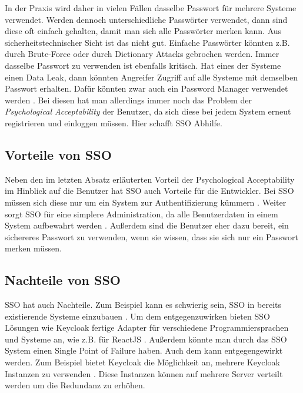 In der Praxis wird daher in vielen Fällen dasselbe Passwort für mehrere Systeme verwendet. Werden dennoch unterschiedliche Passwörter verwendet, dann sind diese oft einfach gehalten, damit man sich alle Passwörter merken kann. Aus sicherheitstechnischer Sicht ist das nicht gut. Einfache Passwörter könnten z.B. durch Brute-Force oder durch Dictionary Attacks gebrochen werden. Immer dasselbe Passwort zu verwenden ist ebenfalls kritisch. Hat eines der Systeme einen Data Leak, dann könnten Angreifer Zugriff auf alle Systeme mit demselben Passwort erhalten. Dafür könnten zwar auch ein Password Manager verwendet werden \cite{EB34}. Bei diesen hat man allerdings immer noch das Problem der \textit{Psychological Acceptability} der Benutzer, da sich diese bei jedem System erneut registrieren und einloggen müssen. Hier schafft SSO Abhilfe.

\subsection{Vorteile von SSO}


Neben den im letzten Absatz erläuterten Vorteil der Psychological Acceptability im Hinblick auf die Benutzer hat SSO auch Vorteile für die Entwickler. Bei SSO müssen sich diese nur um ein System zur Authentifizierung kümmern \cite{EB34}. Weiter sorgt SSO für eine simplere Administration, da alle Benutzerdaten in einem System aufbewahrt werden \cite{EB34}. Außerdem sind die Benutzer eher dazu bereit, ein sichereres Passwort zu verwenden, wenn sie wissen, dass sie sich nur ein Passwort merken müssen.

\subsection{Nachteile von SSO}

SSO hat auch Nachteile. Zum Beispiel kann es schwierig sein, SSO in bereits existierende Systeme einzubauen \cite{EB34}. Um dem entgegenzuwirken bieten SSO Lösungen wie Keycloak fertige Adapter für verschiedene Programmiersprachen und Systeme an, wie z.B. für ReactJS \cite{EB35} \cite{EB36}. Außerdem könnte man durch das SSO System einen Single Point of Failure haben. Auch dem kann entgegengewirkt werden. Zum Beispiel bietet Keycloak die Möglichkeit an, mehrere Keycloak Instanzen zu verwenden \cite{EB33}. Diese Instanzen können auf mehrere Server verteilt werden um die Redundanz zu erhöhen. %

